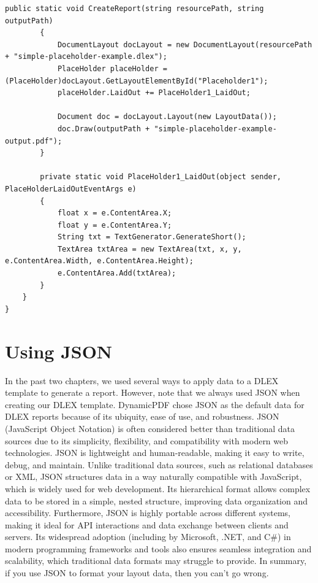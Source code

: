 \documentclass[american,letterpaper]{tufte-book}
\numberwithin{equation}{section}
\numberwithin{figure}{section}
\begin{document}
{{\begin{lstlisting}[caption={Report with placeholder.},label={lis:Report-with-placeholder.},basicstyle={\small\ttfamily},breaklines=true]
        public static void CreateReport(string resourcePath, string outputPath)
        {
            DocumentLayout docLayout = new DocumentLayout(resourcePath + "simple-placeholder-example.dlex");
            PlaceHolder placeHolder = (PlaceHolder)docLayout.GetLayoutElementById("Placeholder1");
            placeHolder.LaidOut += PlaceHolder1_LaidOut;
            
            Document doc = docLayout.Layout(new LayoutData());
            doc.Draw(outputPath + "simple-placeholder-example-output.pdf");
        }

        private static void PlaceHolder1_LaidOut(object sender, PlaceHolderLaidOutEventArgs e)
        {
            float x = e.ContentArea.X;
            float y = e.ContentArea.Y;
            String txt = TextGenerator.GenerateShort();
            TextArea txtArea = new TextArea(txt, x, y, e.ContentArea.Width, e.ContentArea.Height);
            e.ContentArea.Add(txtArea);
        }
    }
}
\end{lstlisting}
\leavevmode\egroup

\section{Using JSON}

In the past two chapters, we used several ways to apply data to a DLEX template to generate a report. However, note that we always used JSON when creating our DLEX template. DynamicPDF chose JSON as the default data for DLEX reports because of its ubiquity, ease of use, and robustness. JSON (JavaScript Object Notation) is often considered better than traditional data sources due to its simplicity, flexibility, and compatibility with modern web technologies. JSON is lightweight and human-readable, making it easy to write, debug, and maintain. Unlike traditional data sources, such as relational databases or XML, JSON structures data in a way naturally compatible with JavaScript, which is widely used for web development. Its hierarchical format allows complex data to be stored in a simple, nested structure, improving data organization and accessibility. Furthermore, JSON is highly portable across different systems, making it ideal for API interactions and data exchange between clients and servers. Its widespread adoption (including by Microsoft, .NET, and C\#) in modern programming frameworks and tools also ensures seamless integration and scalability, which traditional data formats may struggle to provide. In summary, if you use JSON to format your layout data, then you can't go wrong.

}}
\end{document}

